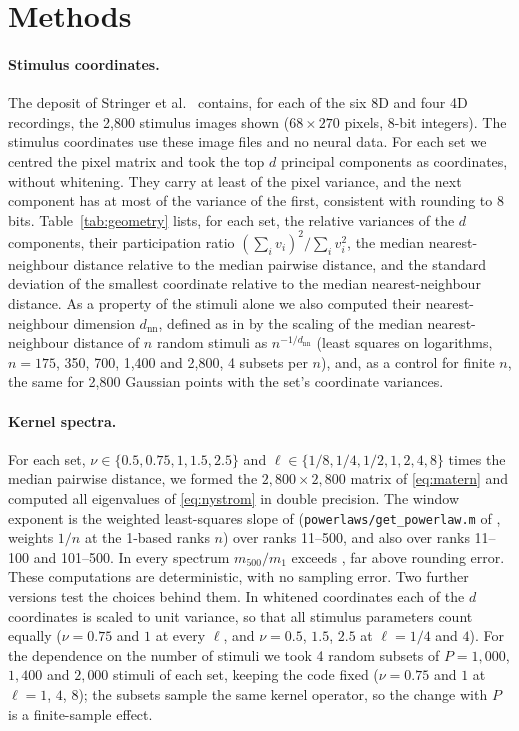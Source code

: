 \documentclass[11pt]{article}
\theoremstyle{definition}
\begin{document}
\section{Methods}\label{sec:methods}

\paragraph{Stimulus coordinates.} The deposit of Stringer et al.\ \cite{stringerdata} contains, for each of the six 8D and four 4D recordings, the 2,800 stimulus images shown ($68 \times 270$ pixels, 8-bit integers). The stimulus coordinates use these image files and no neural data. For each set we centred the pixel matrix and took the top $d$ principal components as coordinates, without whitening. They carry at least \GeoFracMin{} of the pixel variance, and the next component has at most \GeoNextMax{} of the variance of the first, consistent with rounding to 8 bits. Table~\ref{tab:geometry} lists, for each set, the relative variances of the $d$ components, their participation ratio $(\sum_i v_i)^2/\sum_i v_i^2$, the median nearest-neighbour distance relative to the median pairwise distance, and the standard deviation of the smallest coordinate relative to the median nearest-neighbour distance. As a property of the stimuli alone we also computed their nearest-neighbour dimension $d_{\mathrm{nn}}$, defined as in \cite{sgw2020} by the scaling of the median nearest-neighbour distance of $n$ random stimuli as $n^{-1/d_{\mathrm{nn}}}$ (least squares on logarithms, $n = 175$, 350, 700, 1,400 and 2,800, 4 subsets per $n$), and, as a control for finite $n$, the same for 2,800 Gaussian points with the set's coordinate variances.

\paragraph{Kernel spectra.} For each set, $\nu \in \{0.5, 0.75, 1, 1.5, 2.5\}$ and $\ell \in \{1/8, 1/4, 1/2, 1, 2, 4, 8\}$ times the median pairwise distance, we formed the $2{,}800 \times 2{,}800$ matrix of \eqref{eq:matern} and computed all eigenvalues of \eqref{eq:nystrom} in double precision. The window exponent is the weighted least-squares slope of \cite{stringer2019} (\texttt{powerlaws/get\_powerlaw.m} of \cite{stringercode}, weights $1/n$ at the 1-based ranks $n$) over ranks 11--500, and also over ranks 11--100 and 101--500. In every spectrum $m_{500}/m_1$ exceeds \RelFloorMin{}, far above rounding error. These computations are deterministic, with no sampling error. Two further versions test the choices behind them. In whitened coordinates each of the $d$ coordinates is scaled to unit variance, so that all stimulus parameters count equally ($\nu = 0.75$ and $1$ at every $\ell$, and $\nu = 0.5$, $1.5$, $2.5$ at $\ell = 1/4$ and $4$). For the dependence on the number of stimuli we took 4 random subsets of $P = 1{,}000$, $1{,}400$ and $2{,}000$ stimuli of each set, keeping the code fixed ($\nu = 0.75$ and $1$ at $\ell = 1$, $4$, $8$); the subsets sample the same kernel operator, so the change with $P$ is a finite-sample effect.
\end{document}
